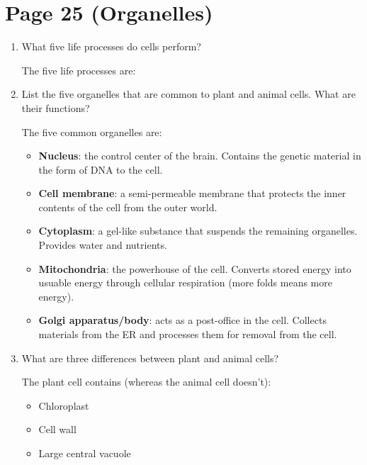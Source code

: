 \documentclass[12pt]{report}
\begin{document}
\section{Page 25 (Organelles)}
\begin{enumerate}
\setlength\itemsep{1em}
    \item{What five life processes do cells perform?}
        \begin{solution}
            The five life processes are: 
        \end{solution}

    \item{List the five organelles that are common to plant and animal cells. What are their functions?}
        \begin{solution}
            The five common organelles are: 
            \begin{itemize}
                \item{\textbf{Nucleus}: the control center of the brain. Contains the genetic material in the form of DNA to the cell.}
                \item{\textbf{Cell membrane}: a semi-permeable membrane that protects the inner contents of the cell from the outer world.}
                \item{ \textbf{Cytoplasm}: a gel-like substance that suspends the remaining organelles. Provides water and nutrients.}
                \item{ \textbf{Mitochondria}: the powerhouse of the cell. Converts stored energy into usuable energy through cellular respiration (more folds means more energy).}
                \item{ \textbf{Golgi apparatus/body}: acts as a post-office in the cell. Collects materials from the ER and processes them for removal from the cell.}
            \end{itemize}
        \end{solution}

    \item{What are three differences between plant and animal cells?}
        \begin{solution}
            The plant cell contains (whereas the animal cell doesn't): 
            \begin{itemize}
                \item{Chloroplast}
                \item{Cell wall}
                \item{Large central vacuole}
            \end{itemize}
        \end{solution}


\end{enumerate}
\end{document}
